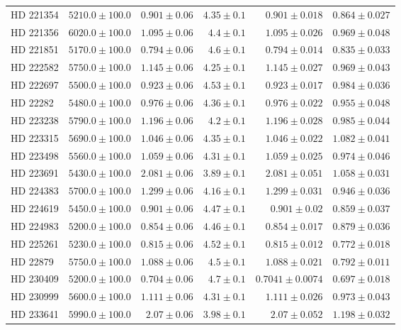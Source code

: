 \begin{longtable*}{lrrrrr}
HD 221354 & $5210.0\pm 100.0$ & $0.901\pm 0.06$ & $4.35\pm 0.1$ & $0.901\pm 0.018$ & $0.864\pm 0.027$ \\ 
HD 221356 & $6020.0\pm 100.0$ & $1.095\pm 0.06$ & $4.4\pm 0.1$ & $1.095\pm 0.026$ & $0.969\pm 0.048$ \\ 
HD 221851 & $5170.0\pm 100.0$ & $0.794\pm 0.06$ & $4.6\pm 0.1$ & $0.794\pm 0.014$ & $0.835\pm 0.033$ \\ 
HD 222582 & $5750.0\pm 100.0$ & $1.145\pm 0.06$ & $4.25\pm 0.1$ & $1.145\pm 0.027$ & $0.969\pm 0.043$ \\ 
HD 222697 & $5500.0\pm 100.0$ & $0.923\pm 0.06$ & $4.53\pm 0.1$ & $0.923\pm 0.017$ & $0.984\pm 0.036$ \\ 
HD 22282 & $5480.0\pm 100.0$ & $0.976\pm 0.06$ & $4.36\pm 0.1$ & $0.976\pm 0.022$ & $0.955\pm 0.048$ \\ 
HD 223238 & $5790.0\pm 100.0$ & $1.196\pm 0.06$ & $4.2\pm 0.1$ & $1.196\pm 0.028$ & $0.985\pm 0.044$ \\ 
HD 223315 & $5690.0\pm 100.0$ & $1.046\pm 0.06$ & $4.35\pm 0.1$ & $1.046\pm 0.022$ & $1.082\pm 0.041$ \\ 
HD 223498 & $5560.0\pm 100.0$ & $1.059\pm 0.06$ & $4.31\pm 0.1$ & $1.059\pm 0.025$ & $0.974\pm 0.046$ \\ 
HD 223691 & $5430.0\pm 100.0$ & $2.081\pm 0.06$ & $3.89\pm 0.1$ & $2.081\pm 0.051$ & $1.058\pm 0.031$ \\ 
HD 224383 & $5700.0\pm 100.0$ & $1.299\pm 0.06$ & $4.16\pm 0.1$ & $1.299\pm 0.031$ & $0.946\pm 0.036$ \\ 
HD 224619 & $5450.0\pm 100.0$ & $0.901\pm 0.06$ & $4.47\pm 0.1$ & $0.901\pm 0.02$ & $0.859\pm 0.037$ \\ 
HD 224983 & $5200.0\pm 100.0$ & $0.854\pm 0.06$ & $4.46\pm 0.1$ & $0.854\pm 0.017$ & $0.879\pm 0.036$ \\ 
HD 225261 & $5230.0\pm 100.0$ & $0.815\pm 0.06$ & $4.52\pm 0.1$ & $0.815\pm 0.012$ & $0.772\pm 0.018$ \\ 
HD 22879 & $5750.0\pm 100.0$ & $1.088\pm 0.06$ & $4.5\pm 0.1$ & $1.088\pm 0.021$ & $0.792\pm 0.011$ \\ 
HD 230409 & $5200.0\pm 100.0$ & $0.704\pm 0.06$ & $4.7\pm 0.1$ & $0.7041\pm 0.0074$ & $0.697\pm 0.018$ \\ 
HD 230999 & $5600.0\pm 100.0$ & $1.111\pm 0.06$ & $4.31\pm 0.1$ & $1.111\pm 0.026$ & $0.973\pm 0.043$ \\ 
HD 233641 & $5990.0\pm 100.0$ & $2.07\pm 0.06$ & $3.98\pm 0.1$ & $2.07\pm 0.052$ & $1.198\pm 0.032$ \\ 

\end{longtable*}
